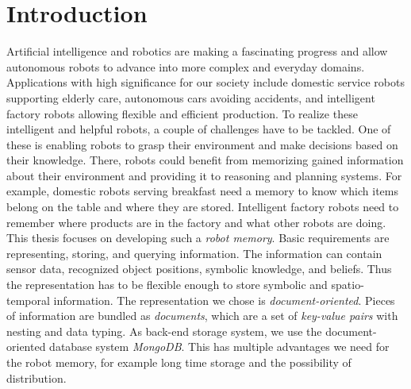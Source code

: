 \chapter{Introduction}
\label{chap:introduction}
Artificial intelligence and robotics are making a fascinating progress
and allow autonomous robots to advance into more complex and everyday domains.
Applications with high significance for our society include domestic
service robots supporting elderly care, autonomous cars avoiding
accidents, and intelligent factory robots allowing flexible and
efficient production. To realize these intelligent and helpful robots,
a couple of challenges have to be tackled. One of these is enabling
robots to grasp their environment and make decisions based on their
knowledge. There, robots could benefit from memorizing gained information
about their environment and providing it to reasoning and planning
systems. For example, domestic robots serving breakfast need a memory
to know which items belong on the table and where they are
stored. Intelligent factory robots need to remember where products are
in the factory and what other robots are doing.
%
This thesis focuses on developing such a \emph{robot memory}. Basic
requirements are representing, storing, and querying information. The
information can contain sensor data, recognized object positions,
symbolic knowledge, and beliefs. Thus the representation has to be
flexible enough to store symbolic and spatio-temporal information. The
representation we chose is \emph{document-oriented}. Pieces of
information are bundled as \emph{documents}, which are a set of
\emph{key-value pairs} with nesting and data typing. As
back-end storage system, we use the document-oriented database system
\emph{MongoDB}. This has multiple advantages we need for the robot
memory, for example long time storage and the possibility of
distribution.


